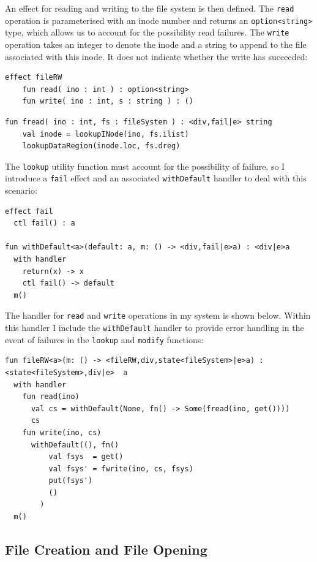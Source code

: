 \documentclass[logo,bsc,singlespacing,parskip]{infthesis}
\begin{document}
An effect for reading and writing to the file system is then defined. The \lstinline{read} operation is parameterised with an inode number and returns an \lstinline{option<string>} type, which allows us to account for the possibility read failures. The \lstinline{write} operation takes an integer to denote the inode and a string to append to the file associated with this inode. It does not indicate whether the write has succeeded:

\begin{lstlisting}
effect fileRW
    fun read( ino : int ) : option<string>
    fun write( ino : int, s : string ) : ()
\end{lstlisting}

\begin{lstlisting}
fun fread( ino : int, fs : fileSystem ) : <div,fail|e> string
    val inode = lookupINode(ino, fs.ilist)
    lookupDataRegion(inode.loc, fs.dreg)
\end{lstlisting}

The \texttt{lookup} utility function must account for the possibility of failure, so I introduce a \texttt{fail} effect and an associated \texttt{withDefault} handler to deal with this scenario:

\begin{lstlisting}
effect fail
  ctl fail() : a

fun withDefault<a>(default: a, m: () -> <div,fail|e>a) : <div|e>a
  with handler
    return(x) -> x
    ctl fail() -> default
  m()
\end{lstlisting}

The  handler for \lstinline{read} and \lstinline{write} operations in my system is shown below. Within this handler I include the  \lstinline{withDefault} handler to provide error handling in the event of failures in the \lstinline{lookup} and \lstinline{modify} functions:


\begin{lstlisting}
fun fileRW<a>(m: () -> <fileRW,div,state<fileSystem>|e>a) : <state<fileSystem>,div|e>  a 
  with handler
    fun read(ino) 
      val cs = withDefault(None, fn() -> Some(fread(ino, get())))
      cs
    fun write(ino, cs) 
      withDefault((), fn() 
          val fsys  = get()
          val fsys' = fwrite(ino, cs, fsys)
          put(fsys')
          ()
        )
  m()
\end{lstlisting}


\subsection{File Creation and File Opening}
\end{document}
